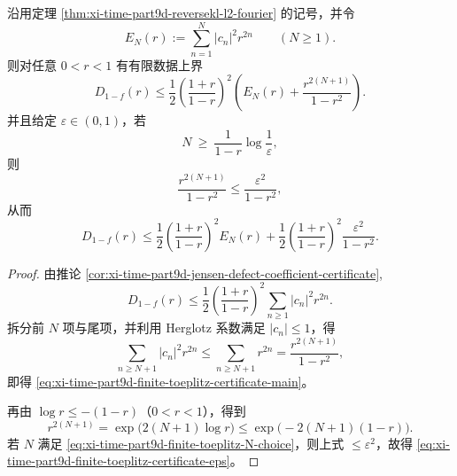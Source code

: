 \begin{theorem}\label{thm:xi-time-part9d-finite-toeplitz-certificate}
沿用定理 \ref{thm:xi-time-part9d-reversekl-l2-fourier} 的记号，并令
\[
E_N(r):=\sum_{n=1}^{N}|c_n|^2r^{2n}\qquad(N\ge1).
\]
则对任意 \(0<r<1\) 有有限数据上界
\begin{equation}\label{eq:xi-time-part9d-finite-toeplitz-certificate-main}
D_{1-f}(r)
\le \frac12\left(\frac{1+r}{1-r}\right)^2
\left(E_N(r)+\frac{r^{2(N+1)}}{1-r^2}\right).
\end{equation}
并且给定 \(\varepsilon\in(0,1)\)，若
\begin{equation}\label{eq:xi-time-part9d-finite-toeplitz-N-choice}
N\ \ge\ \frac{1}{1-r}\log\frac{1}{\varepsilon},
\end{equation}
则
\[
\frac{r^{2(N+1)}}{1-r^2}\le \frac{\varepsilon^2}{1-r^2},
\]
从而
\begin{equation}\label{eq:xi-time-part9d-finite-toeplitz-certificate-eps}
D_{1-f}(r)
\le \frac12\left(\frac{1+r}{1-r}\right)^2E_N(r)
+\frac12\left(\frac{1+r}{1-r}\right)^2\frac{\varepsilon^2}{1-r^2}.
\end{equation}
\end{theorem}
\begin{proof}
由推论 \ref{cor:xi-time-part9d-jensen-defect-coefficient-certificate},
\[
D_{1-f}(r)\le \frac12\left(\frac{1+r}{1-r}\right)^2
\sum_{n\ge1}|c_n|^2r^{2n}.
\]
拆分前 \(N\) 项与尾项，并利用 Herglotz 系数满足 \(|c_n|\le1\)，得
\[
\sum_{n\ge N+1}|c_n|^2r^{2n}
\le \sum_{n\ge N+1}r^{2n}
=\frac{r^{2(N+1)}}{1-r^2},
\]
即得 \eqref{eq:xi-time-part9d-finite-toeplitz-certificate-main}。

再由 \(\log r\le -(1-r)\)（\(0<r<1\)），得到
\[
r^{2(N+1)}
=\exp\!\bigl(2(N+1)\log r\bigr)
\le \exp\!\bigl(-2(N+1)(1-r)\bigr).
\]
若 \(N\) 满足 \eqref{eq:xi-time-part9d-finite-toeplitz-N-choice}，则上式 \(\le \varepsilon^2\)，故得
\eqref{eq:xi-time-part9d-finite-toeplitz-certificate-eps}。
\end{proof}

